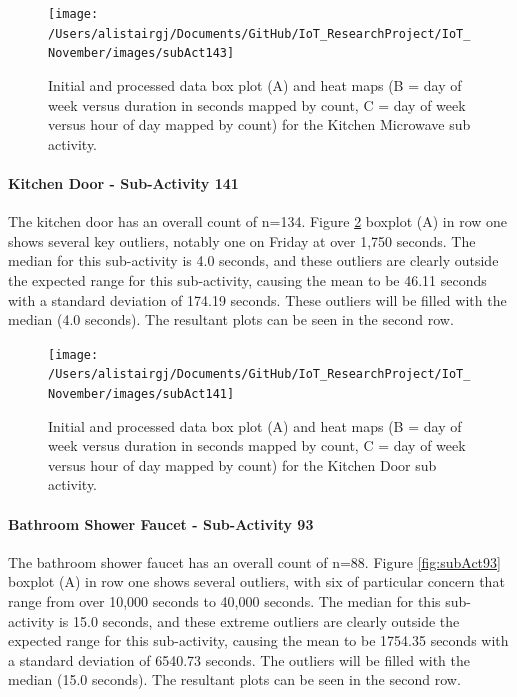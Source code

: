 \documentclass[11pt,]{article}
\let\oldparagraph\paragraph
\renewcommand{\paragraph}[1]{\oldparagraph{#1}\mbox{}}
\begin{document}
\begin{figure}[H]

{\centering \texttt{[image: /Users/alistairgj/Documents/GitHub/IoT\_ResearchProject/IoT\_November/images/subAct143]} 

}

\caption{Initial and processed data box plot (A) and heat maps (B = day of week versus duration in seconds mapped by count, C = day of week versus hour of day mapped by count) for the Kitchen Microwave sub activity.}\label{fig:subAct143}
\end{figure}

\hypertarget{kitchen-door---sub-activity-141}{%
\paragraph{Kitchen Door - Sub-Activity
141}\label{kitchen-door---sub-activity-141}}

The kitchen door has an overall count of n=134. Figure
\ref{fig:subAct141} boxplot (A) in row one shows several key outliers,
notably one on Friday at over 1,750 seconds. The median for this
sub-activity is 4.0 seconds, and these outliers are clearly outside the
expected range for this sub-activity, causing the mean to be 46.11
seconds with a standard deviation of 174.19 seconds. These outliers will
be filled with the median (4.0 seconds). The resultant plots can be seen
in the second row.

\begin{figure}[H]

{\centering \texttt{[image: /Users/alistairgj/Documents/GitHub/IoT\_ResearchProject/IoT\_November/images/subAct141]} 

}

\caption{Initial and processed data box plot (A) and heat maps (B = day of week versus duration in seconds mapped by count, C = day of week versus hour of day mapped by count) for the Kitchen Door sub activity.}\label{fig:subAct141}
\end{figure}

\hypertarget{bathroom-shower-faucet---sub-activity-93}{%
\paragraph{Bathroom Shower Faucet - Sub-Activity
93}\label{bathroom-shower-faucet---sub-activity-93}}

The bathroom shower faucet has an overall count of n=88. Figure
\ref{fig:subAct93} boxplot (A) in row one shows several outliers, with
six of particular concern that range from over 10,000 seconds to 40,000
seconds. The median for this sub-activity is 15.0 seconds, and these
extreme outliers are clearly outside the expected range for this
sub-activity, causing the mean to be 1754.35 seconds with a standard
deviation of 6540.73 seconds. The outliers will be filled with the
median (15.0 seconds). The resultant plots can be seen in the second
row.
\end{document}
